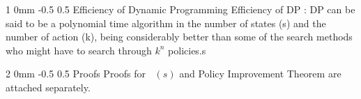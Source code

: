 \documentclass[twocolumn,11pt]{article}
\makeatletter
\DeclareMathOperator{\vp}{v_\pi} %
\renewcommand{\section}{\@startsection
{section}%
{2}%
{0mm}%
{-0.5\baselineskip}%
{0.5\baselineskip}%
{\bfseries\color{blue}}} %
\renewcommand{\subsection}{\@startsection
{subsection}%
{1}%
{0mm}%
{-0.5\baselineskip}%
{0.5\baselineskip}%
{\bfseries\color{blue}}} %
\makeatother
\begin{document}
\subsection{Efficiency of Dynamic Programming}
Efficiency of DP : DP can be said to be a polynomial time algorithm in the number of states (s) and the number of action  (k), being considerably better than some of the search methods who might have to search through $k^{n}$ policies.s

\section{Proofs}
Proofs for $\vp(s)$ and Policy Improvement Theorem are attached separately.

\end{document}
